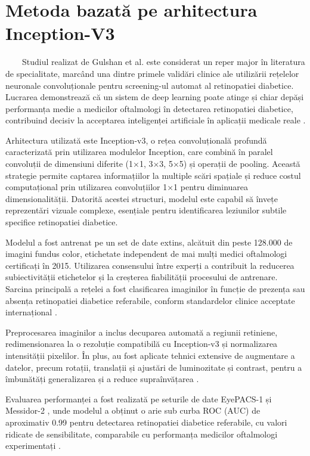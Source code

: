 \documentclass[12pt, a4paper, twoside, romanian]{teza-upb}
\begin{document}
\section{Metoda bazată pe arhitectura Inception-V3 \cite{3_gulshan2016development}}

\ \ \ \ Studiul realizat de Gulshan et al. \cite{3_gulshan2016development} este considerat un reper major
în literatura de specialitate,
marcând una dintre primele validări clinice ale utilizării rețelelor neuronale convoluționale
pentru screening-ul automat al retinopatiei diabetice. Lucrarea demonstrează că un sistem de deep
learning poate atinge și chiar depăși performanța medie a medicilor oftalmologi în detectarea
retinopatiei diabetice, contribuind decisiv la acceptarea inteligenței artificiale în aplicații medicale reale
\cite{3_gulshan2016development}.
\bigskip

Arhitectura utilizată este Inception-v3, o rețea convoluțională profundă caracterizată prin
utilizarea modulelor Inception, care combină în paralel convoluții de dimensiuni diferite (1×1, 3×3, 5×5)
și operații de pooling. Această strategie permite captarea informațiilor la multiple scări spațiale și reduce
costul computațional prin utilizarea convoluțiilor 1×1 pentru diminuarea dimensionalității. Datorită
acestei structuri, modelul este capabil să învețe reprezentări vizuale complexe, esențiale pentru
identificarea leziunilor subtile specifice retinopatiei diabetice.
\bigskip

Modelul a fost antrenat pe un set de date extins, alcătuit din
peste 128.000 de imagini fundus
color, etichetate independent de mai mulți medici oftalmologi certificați în 2015. Utilizarea consensului
între experți a contribuit la reducerea subiectivității etichetelor și la creșterea fiabilității procesului de
antrenare. Sarcina principală a rețelei a fost clasificarea imaginilor în funcție de prezența sau absența
retinopatiei diabetice referabile, conform standardelor clinice acceptate internațional \cite{3_gulshan2016development}.
\bigskip

Preprocesarea imaginilor a inclus decuparea automată a regiunii retiniene, redimensionarea la o
rezoluție compatibilă cu Inception-v3 și normalizarea intensității pixelilor. În plus, au fost aplicate tehnici
extensive de augmentare a datelor, precum rotații, translații și ajustări de luminozitate și contrast, pentru
a îmbunătăți generalizarea și a reduce supraînvățarea \cite{3_gulshan2016development} \cite{10_jabbar2022transfer}.
\bigskip

Evaluarea performanței a fost realizată pe seturile de date EyePACS-1 și Messidor-2 \cite{9_chetoui2020explainable}, unde modelul a
obținut o arie sub curba ROC (AUC) de aproximativ 0.99 pentru detectarea retinopatiei diabetice
referabile, cu valori ridicate de sensibilitate, comparabile cu performanța medicilor oftalmologi
experimentați \cite{3_gulshan2016development} \cite{4_pratt2016convolutional}.
\end{document}
